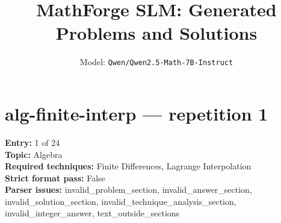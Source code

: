 \documentclass[11pt]{article}
\title{MathForge SLM: Generated Problems and Solutions}
\author{Model: \texttt{Qwen/Qwen2.5-Math-7B-Instruct}}
\date{}
\begin{document}
\maketitle
\tableofcontents
\bigskip
\noindent{}
\clearpage
\section{alg-finite-interp --- repetition 1}
{\color{metadata}
\textbf{Entry:} 1 of 24\\
\textbf{Topic:} Algebra\\
\textbf{Required techniques:} Finite Differences, Lagrange Interpolation\\
\textbf{Strict format pass:} False\\
\textbf{Parser issues:} invalid\_problem\_section, invalid\_answer\_section, invalid\_solution\_section, invalid\_technique\_analysis\_section, invalid\_integer\_answer, text\_outside\_sections
}
\end{document}
